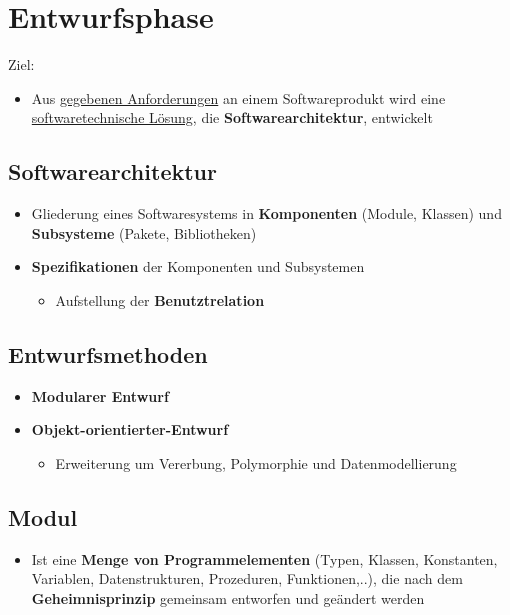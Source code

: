 \section{Entwurfsphase}
	
	Ziel:
	\begin{itemize}
		\item Aus \underline{gegebenen Anforderungen} an einem Softwareprodukt wird eine \newline \underline{softwaretechnische Lösung}, die \textbf{Softwarearchitektur}, entwickelt
	\end{itemize}
		
	\subsection{Softwarearchitektur}
			
		\begin{itemize}
			\item Gliederung eines Softwaresystems in \textbf{Komponenten} (Module, Klassen) und \textbf{Subsysteme} (Pakete, Bibliotheken)
			\item \textbf{Spezifikationen} der Komponenten und Subsystemen
			\begin{itemize}
				\item Aufstellung der \textbf{Benutztrelation}
			\end{itemize}
		\end{itemize}
		
	\subsection{Entwurfsmethoden}
			
		\begin{itemize}
			\item \textbf{Modularer Entwurf}
			\item \textbf{Objekt-orientierter-Entwurf}
			\begin{itemize}
				\item Erweiterung um Vererbung, Polymorphie und Datenmodellierung
			\end{itemize}
		\end{itemize}
	
	\subsection{Modul}
	
		\begin{itemize}
			\item Ist eine \textbf{Menge von Programmelementen} (Typen, Klassen, Konstanten, Variablen, Datenstrukturen, Prozeduren, Funktionen,..), die nach dem \textbf{Geheimnisprinzip} gemeinsam entworfen und geändert werden
		\end{itemize}
	
